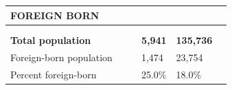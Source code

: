 \documentclass[9pt]{report}
\begin{document}
\newpage
\setlength{\tabcolsep}{.01in} %
\begin{tabular}{p{.10in}p{.10in}p{.10in}p{3.7in}>{\hfill}p{.85in}>{\hfill}p{.85in}>{\hfill}p{.85in}>{\hfill}p{.85in}p{0.1in}}
\multicolumn{9}{l}{\parbox{7.1in}{\raggedright{\large{\strut\textbf{FOREIGN BORN}\strut}}}} \\ 
\hline
\multicolumn{4}{l}{\parbox{3.5in}{\raggedright{\textbf{}}}} & \multicolumn{1}{r}{\parbox{.85in}{\strut\raggedleft{\textbf{}\strut}}} & \multicolumn{1}{r}{\parbox{.85in}{\strut\raggedleft{\textbf{}\strut}}} & \multicolumn{1}{r}{\parbox{.85in}{\strut{}}} & \multicolumn{1}{r}{\parbox{.85in}{\strut{}}} & \\ 
\multicolumn{9}{l}{} \\ 
\multicolumn{4}{l}{\parbox{3.5in}{\strut\raggedright{\textbf{Total population}\strut}}} & \textbf{} & \textbf{} & \textbf{5,941} & \textbf{135,736} & \textbf{} \\ 
\multicolumn{4}{l}{\parbox{3.6in}{\strut\raggedright{{Foreign-born population}}\strut}} &  &  & 1,474 & 23,754 & \multicolumn{1}{l}{}  \\ 
\multicolumn{4}{l}{\parbox{3.6in}{\strut\raggedright{{Percent foreign-born}}\strut}} &  &  & 25.0\% & 18.0\% & \multicolumn{1}{l}{}  \\ 

\end{tabular}
\setlength{\tabcolsep}{6pt} %
\end{document}
